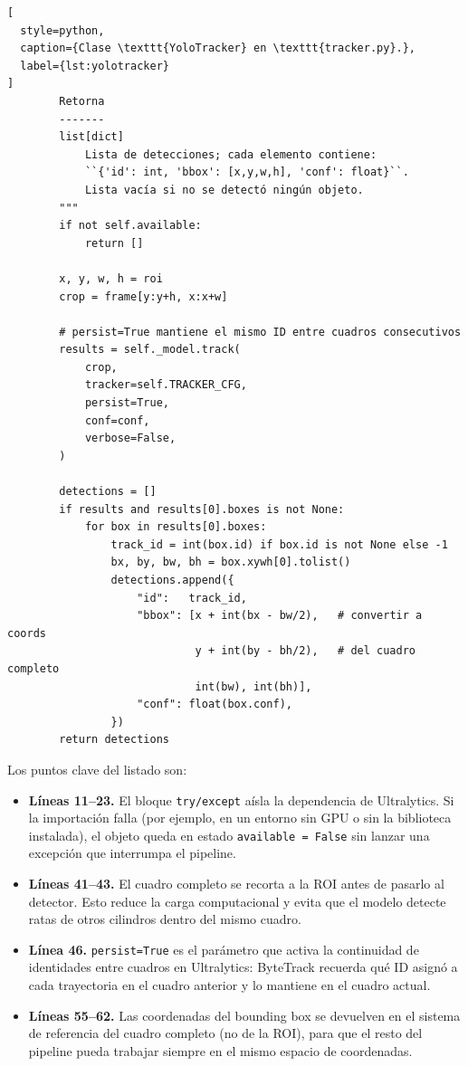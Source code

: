 \begin{lstlisting}[
  style=python,
  caption={Clase \texttt{YoloTracker} en \texttt{tracker.py}.},
  label={lst:yolotracker}
]
        Retorna
        -------
        list[dict]
            Lista de detecciones; cada elemento contiene:
            ``{'id': int, 'bbox': [x,y,w,h], 'conf': float}``.
            Lista vacía si no se detectó ningún objeto.
        """
        if not self.available:
            return []

        x, y, w, h = roi
        crop = frame[y:y+h, x:x+w]

        # persist=True mantiene el mismo ID entre cuadros consecutivos
        results = self._model.track(
            crop,
            tracker=self.TRACKER_CFG,
            persist=True,
            conf=conf,
            verbose=False,
        )

        detections = []
        if results and results[0].boxes is not None:
            for box in results[0].boxes:
                track_id = int(box.id) if box.id is not None else -1
                bx, by, bw, bh = box.xywh[0].tolist()
                detections.append({
                    "id":   track_id,
                    "bbox": [x + int(bx - bw/2),   # convertir a coords
                             y + int(by - bh/2),   # del cuadro completo
                             int(bw), int(bh)],
                    "conf": float(box.conf),
                })
        return detections
\end{lstlisting}

Los puntos clave del listado son:

\begin{itemize}
    \item \textbf{Líneas 11--23.} El bloque \texttt{try/except} aísla la
    dependencia de Ultralytics. Si la importación falla (por ejemplo, en un
    entorno sin GPU o sin la biblioteca instalada), el objeto queda en estado
    \texttt{available = False} sin lanzar una excepción que interrumpa el
    pipeline.

    \item \textbf{Líneas 41--43.} El cuadro completo se recorta a la ROI
    antes de pasarlo al detector. Esto reduce la carga computacional y evita
    que el modelo detecte ratas de otros cilindros dentro del mismo cuadro.

    \item \textbf{Línea 46.} \texttt{persist=True} es el parámetro que activa
    la continuidad de identidades entre cuadros en Ultralytics: ByteTrack
    recuerda qué ID asignó a cada trayectoria en el cuadro anterior y lo
    mantiene en el cuadro actual.

    \item \textbf{Líneas 55--62.} Las coordenadas del bounding box se
    devuelven en el sistema de referencia del cuadro completo (no de la ROI),
    para que el resto del pipeline pueda trabajar siempre en el mismo espacio
    de coordenadas.
\end{itemize}


